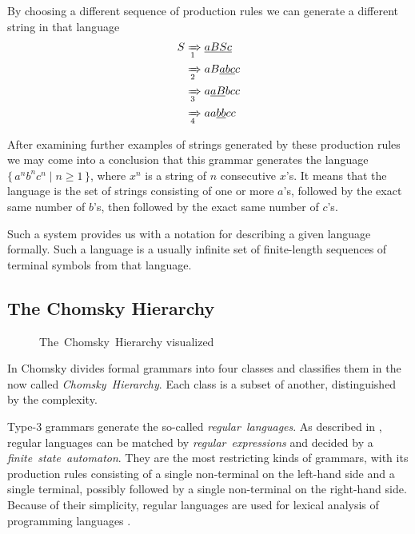 \documentclass[english,engineering]{wizthesis}
\begin{document}
By choosing a different sequence of production rules we can generate a different
string in that language
\begin{equation*}
\begin{split}
  S & \xRightarrow[1]{} \underline{aBSc} \\
    & \xRightarrow[2]{} aB\underline{abc}c \\
    & \xRightarrow[3]{} a\underline{aB}bcc \\
    & \xRightarrow[4]{} aa\underline{bb}cc
\end{split}
\end{equation*}

After examining further examples of strings generated by these production rules
we may come into a conclusion that this grammar generates the language
$\{\,a^nb^nc^n \mid n \ge 1\,\}$, where $x^n$ is a string of $n$ consecutive $x$'s.
It means that the language is the set of strings consisting of one or more
$a$'s, followed by the exact same number of $b$'s, then followed by the exact
same number of $c$'s.

Such a system provides us with a notation for describing a given
language formally. Such a language is a usually infinite set of finite-length
sequences of terminal symbols from that language.

\subsection{The Chomsky Hierarchy}

\begin{wrapfigure}{R}{0.45\textwidth}
  \centering
  \caption{The~Chomsky~Hierarchy visualized}
  \label{fig:chomsky-hierarchy}
\end{wrapfigure}

In \cite{chomsky-1956} Chomsky divides formal grammars into four classes and
classifies them in the now called \textit{Chomsky~Hierarchy}. Each class is a
subset of another, distinguished by the complexity.

Type-3 grammars generate the so-called \textit{regular~languages}. As described
in \cite{aho-1990}, regular languages can be matched by
\textit{regular~expressions} and decided by a \textit{finite~state~automaton}.
They are the most restricting kinds of grammars, with its production rules
consisting of a single non-terminal on the left-hand side and a single terminal,
possibly followed by a single non-terminal on the right-hand side. Because of
their simplicity, regular languages are used for lexical analysis of programming
languages \cite{johnson-porter-ackley-ross-1968}.
\end{document}
